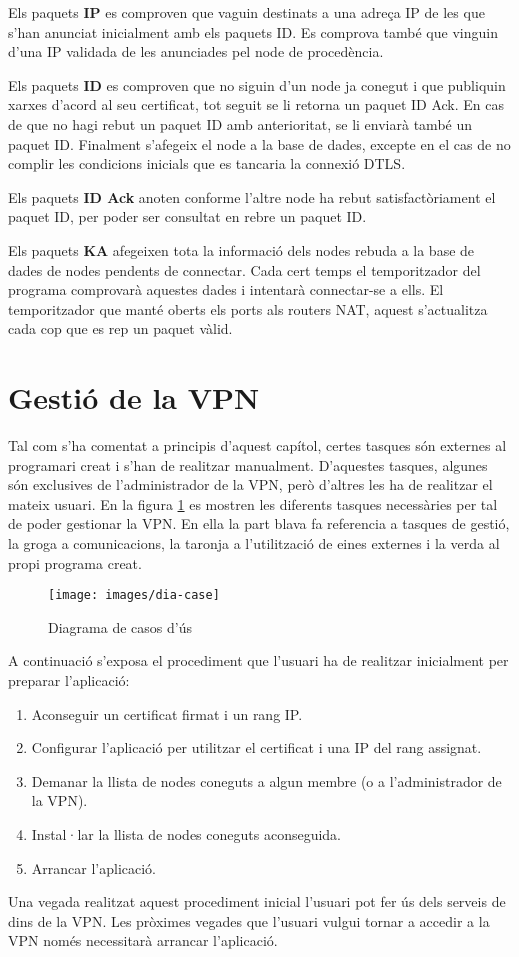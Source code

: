Els paquets \textbf{IP} es comproven que vaguin destinats a una adreça IP de les que s'han anunciat inicialment amb els paquets ID. Es comprova també que vinguin d'una IP validada de les anunciades pel node de procedència. 

Els paquets \textbf{ID} es comproven que no siguin d'un node ja conegut i que publiquin xarxes d'acord al seu certificat, tot seguit se li retorna un paquet ID Ack. En cas de que no hagi rebut un paquet ID amb anterioritat, se li enviarà també un paquet ID. Finalment s'afegeix el node a la base de dades, excepte en el cas de no complir les condicions inicials que es tancaria la connexió DTLS.

Els paquets \textbf{ID Ack} anoten conforme l'altre node ha rebut satisfactòriament el paquet ID, per poder ser consultat en rebre un paquet ID.

Els paquets \textbf{KA} afegeixen tota la informació dels nodes rebuda a la base de dades de nodes pendents de connectar. Cada cert temps el temporitzador del programa comprovarà aquestes dades i intentarà connectar-se a ells. El temporitzador que manté oberts els ports als routers NAT, aquest s'actualitza cada cop que es rep un paquet vàlid.

\section{Gestió de la VPN}
Tal com s'ha comentat a principis d'aquest capítol, certes tasques són externes al programari creat i s'han de realitzar manualment. D'aquestes tasques, algunes són exclusives de l'administrador de la VPN, però d'altres les ha de realitzar el mateix usuari.
En la figura \ref{F:dia-case} es mostren les diferents tasques necessàries per tal de poder gestionar la VPN. En ella la part blava fa referencia a tasques de gestió, la groga a comunicacions, la taronja a l'utilització de eines externes i la verda al propi programa creat.
\begin{figure}[htb]
\centering
\texttt{[image: images/dia-case]}
\caption{Diagrama de casos d'ús}
\label{F:dia-case}
\end{figure}

A continuació s'exposa el procediment que l'usuari ha de realitzar inicialment per preparar l'aplicació:
\begin{enumerate}
\item Aconseguir un certificat firmat i un rang IP.
\item Configurar l'aplicació per utilitzar el certificat i una IP del rang assignat.
\item Demanar la llista de nodes coneguts a algun membre (o a l'administrador de la VPN).
\item Instal·lar la llista de nodes coneguts aconseguida.
\item Arrancar l'aplicació.
\end{enumerate}
Una vegada realitzat aquest procediment inicial l'usuari pot fer ús dels serveis de dins de la VPN. Les pròximes vegades que l'usuari vulgui tornar a accedir a la VPN només necessitarà arrancar l'aplicació.

